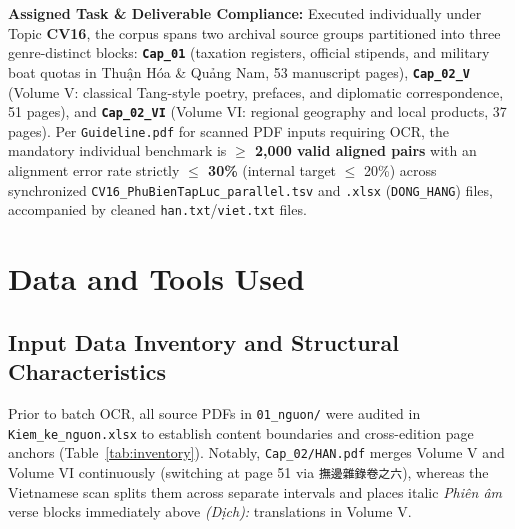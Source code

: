 \documentclass[a4paper]{article}
\begin{document}
\textbf{Assigned Task \& Deliverable Compliance:} Executed individually under Topic \textbf{CV16}, the corpus spans two archival source groups partitioned into three genre-distinct blocks: \textbf{\texttt{Cap\_01}} (taxation registers, official stipends, and military boat quotas in Thuận Hóa \& Quảng Nam, 53 manuscript pages), \textbf{\texttt{Cap\_02\_V}} (Volume V: classical Tang-style poetry, prefaces, and diplomatic correspondence, 51 pages), and \textbf{\texttt{Cap\_02\_VI}} (Volume VI: regional geography and local products, 37 pages). Per \texttt{Guideline.pdf} for scanned PDF inputs requiring OCR, the mandatory individual benchmark is \textbf{$\ge$ 2,000 valid aligned pairs} with an alignment error rate strictly \textbf{$\le$ 30\%} (internal target $\le$ 20\%) across synchronized \texttt{CV16\_PhuBienTapLuc\_parallel.tsv} and \texttt{.xlsx} (\texttt{DONG\_HANG}) files, accompanied by cleaned \texttt{han.txt}/\texttt{viet.txt} files.

\section{Data and Tools Used}
\subsection{Input Data Inventory and Structural Characteristics}
Prior to batch OCR, all source PDFs in \texttt{01\_nguon/} were audited in \texttt{Kiem\_ke\_nguon.xlsx} to establish content boundaries and cross-edition page anchors (Table~\ref{tab:inventory}). Notably, \texttt{Cap\_02/HAN.pdf} merges Volume V and Volume VI continuously (switching at page 51 via \texttt{撫邊雜錄卷之六}), whereas the Vietnamese scan splits them across separate intervals and places italic \textit{Phiên âm} verse blocks immediately above \textit{(Dịch):} translations in Volume V.
\end{document}
